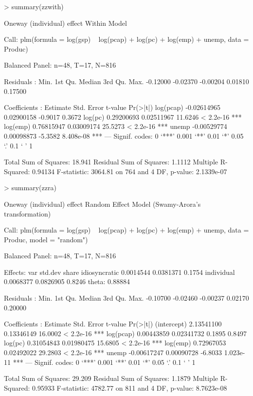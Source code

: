 \documentclass[a4paper]{article}
\begin{document}
\begin{Schunk}
\begin{Sinput}
> summary(zzwith)
\end{Sinput}
\begin{Soutput}
Oneway (individual) effect Within Model

Call:
plm(formula = log(gsp) ~ log(pcap) + log(pc) + log(emp) + unemp, 
    data = Produc)

Balanced Panel: n=48, T=17, N=816

Residuals :
    Min.  1st Qu.   Median  3rd Qu.     Max. 
-0.12000 -0.02370 -0.00204  0.01810  0.17500 

Coefficients :
             Estimate  Std. Error t-value  Pr(>|t|)    
log(pcap) -0.02614965  0.02900158 -0.9017    0.3672    
log(pc)    0.29200693  0.02511967 11.6246 < 2.2e-16 ***
log(emp)   0.76815947  0.03009174 25.5273 < 2.2e-16 ***
unemp     -0.00529774  0.00098873 -5.3582 8.408e-08 ***
---
Signif. codes:  0 ‘***’ 0.001 ‘**’ 0.01 ‘*’ 0.05 ‘.’ 0.1 ‘ ’ 1 

Total Sum of Squares: 18.941
Residual Sum of Squares: 1.1112
Multiple R-Squared: 0.94134
F-statistic: 3064.81 on 764 and 4 DF, p-value: 2.1339e-07
\end{Soutput}
\begin{Sinput}
> summary(zzra)
\end{Sinput}
\begin{Soutput}
Oneway (individual) effect Random Effect Model (Swamy-Arora's transformation)

Call:
plm(formula = log(gsp) ~ log(pcap) + log(pc) + log(emp) + unemp, 
    data = Produc, model = "random")

Balanced Panel: n=48, T=17, N=816

Effects:
                    var   std.dev  share
idiosyncratic 0.0014544 0.0381371 0.1754
individual    0.0068377 0.0826905 0.8246
theta:  0.88884  

Residuals :
    Min.  1st Qu.   Median  3rd Qu.     Max. 
-0.10700 -0.02460 -0.00237  0.02170  0.20000 

Coefficients :
               Estimate  Std. Error t-value  Pr(>|t|)    
(intercept)  2.13541100  0.13346149 16.0002 < 2.2e-16 ***
log(pcap)    0.00443859  0.02341732  0.1895    0.8497    
log(pc)      0.31054843  0.01980475 15.6805 < 2.2e-16 ***
log(emp)     0.72967053  0.02492022 29.2803 < 2.2e-16 ***
unemp       -0.00617247  0.00090728 -6.8033 1.023e-11 ***
---
Signif. codes:  0 ‘***’ 0.001 ‘**’ 0.01 ‘*’ 0.05 ‘.’ 0.1 ‘ ’ 1 

Total Sum of Squares: 29.209
Residual Sum of Squares: 1.1879
Multiple R-Squared: 0.95933
F-statistic: 4782.77 on 811 and 4 DF, p-value: 8.7623e-08
\end{Soutput}
\end{Schunk}
\end{document}
